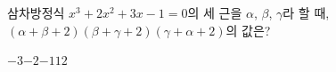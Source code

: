 삼차방정식 $x^3+2x^2+3x-1=0$의 세 근을 $\alpha$, $\beta$, $\gamma$라 할 때, $(\alpha+\beta+2)(\beta+\gamma+2)(\gamma+\alpha+2)$의 값은?
\begin{choices32}{$-3$}{$-2$}{$-1$}{$1$}{$2$}\end{choices32}
